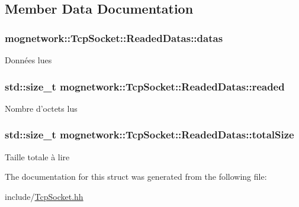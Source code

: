 \subsection{Member Data Documentation}
\hypertarget{structmognetwork_1_1_tcp_socket_1_1_readed_datas_abfdc3750f4970fde4212d7a0e934daa9}{
\subsubsection[{datas}]{ mognetwork\-::\-Tcp\-Socket\-::\-Readed\-Datas\-::datas}}\label{structmognetwork_1_1_tcp_socket_1_1_readed_datas_abfdc3750f4970fde4212d7a0e934daa9}
Données lues \hypertarget{structmognetwork_1_1_tcp_socket_1_1_readed_datas_a2c633a79efa956f1f59d9429e8584cc0}{
\subsubsection[{readed}]{\setlength{\rightskip}{0pt plus 5cm}std\-::size\-\_\-t mognetwork\-::\-Tcp\-Socket\-::\-Readed\-Datas\-::readed}}\label{structmognetwork_1_1_tcp_socket_1_1_readed_datas_a2c633a79efa956f1f59d9429e8584cc0}
Nombre d'octets lus \hypertarget{structmognetwork_1_1_tcp_socket_1_1_readed_datas_aac0aa498d4b98296434cf05785068dcc}{
\subsubsection[{total\-Size}]{\setlength{\rightskip}{0pt plus 5cm}std\-::size\-\_\-t mognetwork\-::\-Tcp\-Socket\-::\-Readed\-Datas\-::total\-Size}}\label{structmognetwork_1_1_tcp_socket_1_1_readed_datas_aac0aa498d4b98296434cf05785068dcc}
Taille totale à lire 

The documentation for this struct was generated from the following file\-:\begin{DoxyCompactItemize}
\item 
include/\hyperlink{_tcp_socket_8hh}{Tcp\-Socket.\-hh}\end{DoxyCompactItemize}

